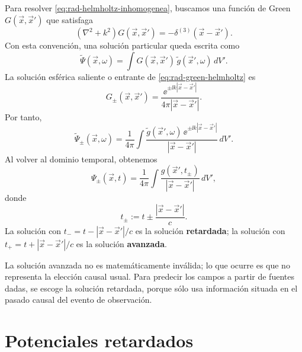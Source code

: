 \documentclass[../main.tex]{subfiles}
\begin{document}
Para resolver \eqref{eq:rad-helmholtz-inhomogenea}, buscamos una función de Green $G(\vec x,\vec x')$ que satisfaga
\begin{equation}
    \left(\nabla^2+k^2\right)G(\vec x,\vec x')
    =-\delta^{(3)}(\vec x-\vec x').
    \label{eq:rad-green-helmholtz}
\end{equation}
Con esta convención, una solución particular queda escrita como
\begin{equation}
    \widetilde\Psi(\vec x,\omega)=
    \int G(\vec x,\vec x')\,\widetilde g(\vec x',\omega)\,dV'.
    \label{eq:rad-solucion-green-frecuencia}
\end{equation}
La solución esférica saliente o entrante de \eqref{eq:rad-green-helmholtz} es
\begin{equation}
    G_{\pm}(\vec x,\vec x')=
    \frac{\ee^{\pm \ii k |\vec x-\vec x'|}}{4\pi |\vec x-\vec x'|}.
    \label{eq:rad-green-pm}
\end{equation}
Por tanto,
\begin{equation}
    \widetilde\Psi_{\pm}(\vec x,\omega)=
    \frac{1}{4\pi}\int
    \frac{\widetilde g(\vec x',\omega)\,\ee^{\pm \ii k |\vec x-\vec x'|}}
    {|\vec x-\vec x'|}\,dV'.
    \label{eq:rad-psi-frecuencia-pm}
\end{equation}
Al volver al dominio temporal, obtenemos
\begin{equation}
    \Psi_{\pm}(\vec x,t)=
    \frac{1}{4\pi}\int
    \frac{g(\vec x',t_{\pm})}{|\vec x-\vec x'|}\,dV',
    \label{eq:rad-solucion-pm-temporal}
\end{equation}
donde
\begin{equation}
    t_{\pm}:=t\pm\frac{|\vec x-\vec x'|}{c}.
    \label{eq:rad-tiempo-pm}
\end{equation}
La solución con $t_-=t-|\vec x-\vec x'|/c$ es la solución \textbf{retardada}; la solución con $t_+=t+|\vec x-\vec x'|/c$ es la solución \textbf{avanzada}.

\begin{cuidado}
La solución avanzada no es matemáticamente inválida; lo que ocurre es que no representa la elección causal usual. Para predecir los campos a partir de fuentes dadas, se escoge la solución retardada, porque sólo usa información situada en el pasado causal del evento de observación.
\end{cuidado}

\section{Potenciales retardados}
\label{subsec:potenciales-retardados}
\end{document}
